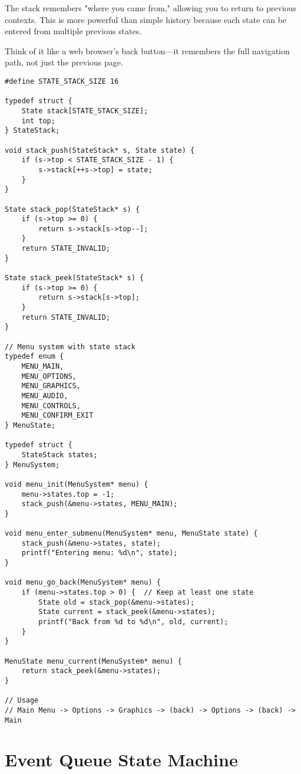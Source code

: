 The stack remembers "where you came from," allowing you to return to previous contexts. This is more powerful than simple history because each state can be entered from multiple previous states.

Think of it like a web browser's back button---it remembers the full navigation path, not just the previous page.

\begin{lstlisting}
#define STATE_STACK_SIZE 16

typedef struct {
    State stack[STATE_STACK_SIZE];
    int top;
} StateStack;

void stack_push(StateStack* s, State state) {
    if (s->top < STATE_STACK_SIZE - 1) {
        s->stack[++s->top] = state;
    }
}

State stack_pop(StateStack* s) {
    if (s->top >= 0) {
        return s->stack[s->top--];
    }
    return STATE_INVALID;
}

State stack_peek(StateStack* s) {
    if (s->top >= 0) {
        return s->stack[s->top];
    }
    return STATE_INVALID;
}

// Menu system with state stack
typedef enum {
    MENU_MAIN,
    MENU_OPTIONS,
    MENU_GRAPHICS,
    MENU_AUDIO,
    MENU_CONTROLS,
    MENU_CONFIRM_EXIT
} MenuState;

typedef struct {
    StateStack states;
} MenuSystem;

void menu_init(MenuSystem* menu) {
    menu->states.top = -1;
    stack_push(&menu->states, MENU_MAIN);
}

void menu_enter_submenu(MenuSystem* menu, MenuState state) {
    stack_push(&menu->states, state);
    printf("Entering menu: %d\n", state);
}

void menu_go_back(MenuSystem* menu) {
    if (menu->states.top > 0) {  // Keep at least one state
        State old = stack_pop(&menu->states);
        State current = stack_peek(&menu->states);
        printf("Back from %d to %d\n", old, current);
    }
}

MenuState menu_current(MenuSystem* menu) {
    return stack_peek(&menu->states);
}

// Usage
// Main Menu -> Options -> Graphics -> (back) -> Options -> (back) -> Main
\end{lstlisting}

\section{Event Queue State Machine}

